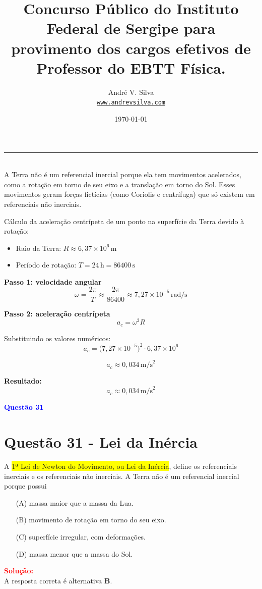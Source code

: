 \documentclass[a4paper,12pt]{article}
\title{Concurso Público do Instituto Federal de Sergipe para provimento dos cargos
efetivos de Professor do EBTT \textbf{\large F\'isica}.}
\author{Andr\'e V. Silva \\ \texttt{\url{www.andrevsilva.com}}}
\date{\today}
\begin{document}
\maketitle

\tableofcontents

\noindent\rule{\linewidth}{0.4pt}\\
\newpage
\justifying
\colorbox{yellow!30}{A Terra não é um referencial inercial porque ela tem movimentos acelerados}, como a rotação em torno de seu eixo 
e a translação em torno do Sol. Esses movimentos geram \colorbox{yellow!30}{forças fictícias (como Coriolis e centrífuga)} que só existem em referenciais não inerciais.

Cálculo da aceleração centrípeta de um ponto na superfície da Terra devido à rotação:

\begin{itemize}
  \item Raio da Terra: \( R \approx 6,37 \times 10^6 \, \mathrm{m} \)
  \item Período de rotação: \( T = 24 \, \mathrm{h} = 86400 \, \mathrm{s} \)
\end{itemize}

\textbf{Passo 1: velocidade angular}
\[
\omega = \frac{2\pi}{T} \approx \frac{2\pi}{86400} \approx 7,27 \times 10^{-5} \, \mathrm{rad/s}
\]

\textbf{Passo 2: aceleração centrípeta}
\[
a_c = \omega^2 R
\]

Substituindo os valores numéricos:
\[
a_c = \bigl(7,27 \times 10^{-5}\bigr)^2 \cdot 6,37 \times 10^6
\]

\[
a_c \approx 0,034 \, \mathrm{m/s}^2
\]

\textbf{Resultado:}
\[
\boxed{a_c \approx 0,034 \, \mathrm{m/s}^2}
\]

\begin{flushleft}
\textbf{\textcolor{blue}{\Large Quest\~ao 31}}\\
\noindent
\section{Quest\~ao 31 - Lei da In\'ercia}
A \colorbox{yellow}{1ª Lei de Newton do Movimento, ou Lei da Inércia}, define 
os referenciais inerciais e os referenciais não inerciais. \colorbox{green!40}{A 
Terra não é um referencial inercial porque possui}

\begin{itemize}
\item[(A)] massa maior que a massa da Lua.
\item[(B)] movimento de rotação em torno do seu eixo.
\item[(C)] superfície irregular, com deformações.
\item[(D)] massa menor que a massa do Sol.
\end{itemize}

\vspace{0.5cm}

\textcolor{red}{\textbf{Solução:}}\\

A resposta correta é alternativa \colorbox{green!50}{\textbf{B}}.
\end{flushleft}
\end{document}
